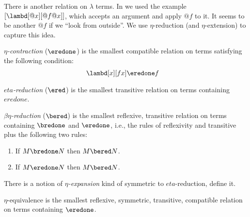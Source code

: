 \documentclass[../../../include/open-logic-section]{subfiles}
\begin{document}

There is another relation on $\lambda$ terms. In
 we used the example $[\lambd[@x][@f@x]]$, which
accepts an argument and apply $@f$ to it. 
It seems to be another $@f$ if we ``look from outside''.  We use $\eta$-reduction (and $\eta$-extension) to
capture this idea.

\begin{defn}
  \emph{$\eta$-contraction} ($\eredone$) is the smallest compatible relation
  on terms satisfying the following condition:
  \begin{align*}
    &\lambd[x][f x] \eredone f
  \end{align*}
\end{defn}

\begin{defn}
  \emph{$eta$-reduction} ($\ered$) is the smallest transitive relation on terms
  containing $eredone$.
\end{defn}

\begin{defn} 
  \emph{$\beta\eta$-reduction} ($\bered$) is the smallest reflexive,
  transitive relation on terms containing $\bredone$ and $\eredone$,
  i.e., the rules of reflexivity and transitive plus the following two
  rules:
  \begin{enumerate}
  \item If $M \bredone N$ then $M \bered N$. 
  \item If $M \eredone N$ then $M \bered N$. 
  \end{enumerate}
    
\end{defn}

\begin{prob}
  There is a notion of \emph{$\eta$-expansion} kind of symmetric to
  $eta$-reduction, define it.
\end{prob}

\begin{defn}
  $\eta$-equivalence is the smallest reflexive, symmetric, transitive, compatible relation on terms containing $\eredone$.
\end{defn}
\end{document}
